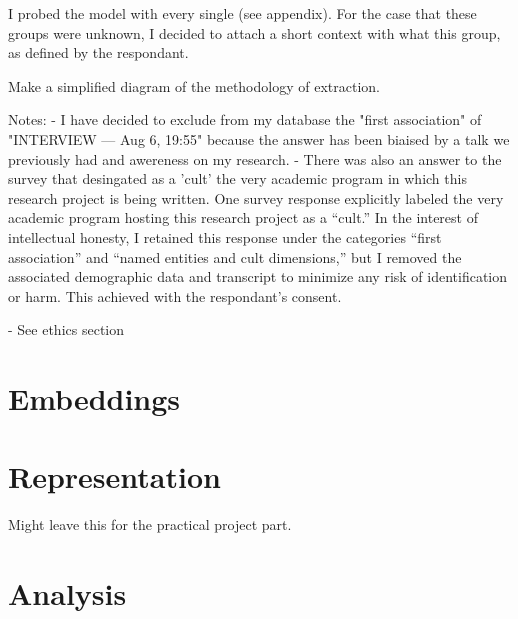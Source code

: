 	I probed the model with every single (see appendix). For the case that these groups were unknown, I decided to attach a short context with what this group, as defined by the respondant. 
	 


Make a simplified diagram of the methodology of extraction. 


Notes: 
- I have decided to exclude from my database the "first association" of "INTERVIEW — Aug 6, 19:55" because the answer has been biaised by a talk we previously had and awereness on my research.
- There was also an answer to the survey that desingated as a 'cult' the very academic program in which this research project is being written. 
One survey response explicitly labeled the very academic program hosting this research project as a “cult.” In the interest of intellectual honesty, I retained this response under the categories “first association” and “named entities and cult dimensions,” but I removed the associated demographic data and transcript to minimize any risk of identification or harm. This achieved with the respondant's consent.

- See ethics section


\section{Embeddings}

\section{Representation}
Might leave this for the practical project part.

\section{Analysis}\label{sec:analysis_methods}

